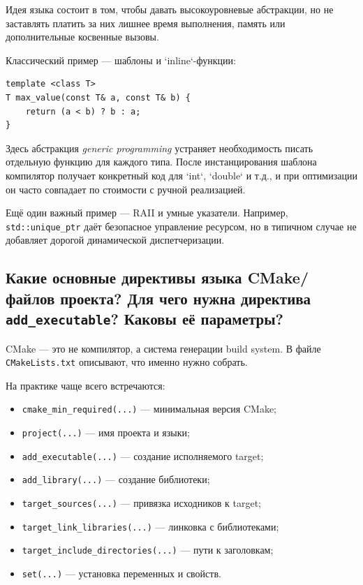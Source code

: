 Идея языка состоит в том, чтобы давать высокоуровневые абстракции, но не заставлять платить за них лишнее время выполнения, память или дополнительные косвенные вызовы.

\begin{example}
Классический пример — шаблоны и `inline`-функции:

\begin{verbatim}
template <class T>
T max_value(const T& a, const T& b) {
    return (a < b) ? b : a;
}
\end{verbatim}

Здесь абстракция \textit{generic programming} устраняет необходимость писать отдельную функцию для каждого типа. После инстанцирования шаблона компилятор получает конкретный код для `int`, `double` и т.д., и при оптимизации он часто совпадает по стоимости с ручной реализацией.
\end{example}

Ещё один важный пример — RAII и умные указатели. Например, \texttt{std::unique\_ptr} даёт безопасное управление ресурсом, но в типичном случае не добавляет дорогой динамической диспетчеризации.

\subsection{Какие основные директивы языка CMake/файлов проекта? Для чего нужна директива \texttt{add\_executable}? Каковы её параметры?}
CMake — это не компилятор, а система генерации build system. В файле \texttt{CMakeLists.txt} описывают, что именно нужно собрать.

\begin{definition}
На практике чаще всего встречаются:
\begin{itemize}
    \item \texttt{cmake\_min\_required(...)} — минимальная версия CMake;
    \item \texttt{project(...)} — имя проекта и языки;
    \item \texttt{add\_executable(...)} — создание исполняемого target;
    \item \texttt{add\_library(...)} — создание библиотеки;
    \item \texttt{target\_sources(...)} — привязка исходников к target;
    \item \texttt{target\_link\_libraries(...)} — линковка с библиотеками;
    \item \texttt{target\_include\_directories(...)} — пути к заголовкам;
    \item \texttt{set(...)} — установка переменных и свойств.
\end{itemize}
\end{definition}

